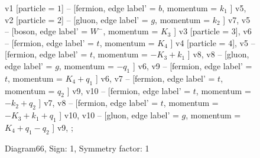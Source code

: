\documentclass{revtex4}
\begin{document}
\begin{figure}[!htb]
\begin{center}
{    %
v1 [particle = \(1\)] -- [fermion, edge label' = \(b\), momentum = \(k_{1}\) ] v5, 
v2 [particle = \(2\)] -- [gluon, edge label' = \(g\), momentum = \(k_{2}\) ] v7, 
v5 -- [boson, edge label' = \(W^{-}\), momentum = \(K_{3}\) ] v3 [particle = \(3\)], 
v6 -- [fermion, edge label' = \(t\), momentum = \(K_{4}\) ] v4 [particle = \(4\)], 
v5 -- [fermion, edge label' = \(t\), momentum = \(-K_{3} + k_{1}\) ] v8, 
v8 -- [gluon, edge label' = \(g\), momentum = \(-q_{1}\) ] v6, 
v9 -- [fermion, edge label' = \(t\), momentum = \(K_{4} + q_{1}\) ] v6, 
v7 -- [fermion, edge label' = \(t\), momentum = \(q_{2}\) ] v9, 
v10 -- [fermion, edge label' = \(t\), momentum = \(-k_{2} + q_{2}\) ] v7, 
v8 -- [fermion, edge label' = \(t\), momentum = \(-K_{3} + k_{1} + q_{1}\) ] v10, 
v10 -- [gluon, edge label' = \(g\), momentum = \(K_{4} + q_{1} - q_{2}\) ] v9, 
};
\end{center}
\caption{Diagram66, Sign: 1, Symmetry factor: 1}
\end{figure}
\newpage
\end{document}
